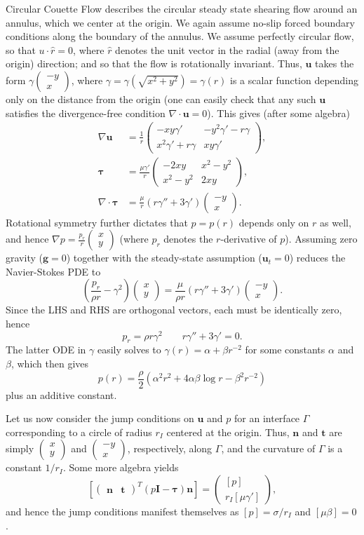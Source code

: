 \documentclass{article}
\newcommand{\q}{\quad\quad}
\newcommand{\uu}{\mathbf{u}}
\newcommand{\II}{\mathbf{I}}
\renewcommand{\gg}{\mathbf{g}}
\renewcommand{\uu}{\mathbf{u}}
\newcommand{\nn}{\mathbf{n}}
\renewcommand{\tt}{\mathbf{t}}
\newcommand{\ta}{\pmb{\tau}}
\newcommand{\mx}[1]{\begin{pmatrix} #1 \end{pmatrix}}
\begin{document}
Circular Couette Flow describes the circular steady state shearing flow around an annulus, which we center at the origin.  We again assume no-slip forced boundary conditions along the boundary of the annulus.  We assume perfectly circular flow, so that $u \cdot \hat{r} = 0$, where $\hat{r}$ denotes the unit vector in the radial (away from the origin) direction; and so that the flow is rotationally invariant.  Thus, $\uu$ takes the form $\gamma \mx{-y \\ x}$, where $\gamma = \gamma \left( \sqrt{x^2 + y^2} \right) = \gamma(r)$ is a scalar function depending only on the distance from the origin (one can easily check that any such $\uu$ satisfies the divergence-free condition $\nabla \cdot \uu = 0$).  This gives (after some algebra)
\begin{align}
\nabla \uu & = \frac{1}{r} \mx{-xy\gamma' & -y^2\gamma'-r\gamma \\ x^2\gamma'+r\gamma & xy\gamma'}, \\
\ta & = \frac{\mu \gamma'}{r} \mx{-2xy & x^2-y^2 \\ x^2-y^2 & 2xy}, \\
\nabla \cdot \ta & = \frac{\mu}{r} \left( r \gamma'' + 3 \gamma' \right) \mx{-y \\ x}.
\end{align}
Rotational symmetry further dictates that $p = p(r)$ depends only on $r$ as well, and hence $\nabla p = \frac{p_r}{r} \mx{x \\ y}$ (where $p_r$ denotes the $r$-derivative of $p$).  Assuming zero gravity ($\gg = 0$) together with the steady-state assumption ($\uu_t = 0$) reduces the Navier-Stokes PDE to
$$ \left( \frac{p_r}{\rho r} - \gamma^2 \right) \mx{x \\ y} = \frac{\mu}{\rho r} \left( r \gamma'' + 3 \gamma' \right) \mx{-y \\ x}. $$
Since the LHS and RHS are orthogonal vectors, each must be identically zero, hence
$$ p_r = \rho r \gamma^2 \q r \gamma'' + 3 \gamma' = 0. $$
The latter ODE in $\gamma$ easily solves to $\gamma(r) = \alpha + \beta r^{-2}$ for some constants $\alpha$ and $\beta$, which then gives
$$ p(r) = \frac{\rho}{2} \left( \alpha^2 r^2 + 4 \alpha \beta \log r - \beta^2 r^{-2} \right) $$
plus an additive constant.

Let us now consider the jump conditions on $\uu$ and $p$ for an interface $\Gamma$ corresponding to a circle of radius $r_I$ centered at the origin.  Thus, $\nn$ and $\tt$ are simply $\mx{x \\ y}$ and $\mx{-y \\ x}$, respectively, along $\Gamma$, and the curvature of $\Gamma$ is a constant $1/r_I$.  Some more algebra yields
$$ \left[ \mx{\nn & \tt}^T \left( p\II - \ta \right) \nn \right] = \mx{[p] \\ r_I [\mu \gamma']}, $$
and hence the jump conditions manifest themselves as $[p] = \sigma/r_I$ and $[\mu \beta] = 0$.
\end{document}
